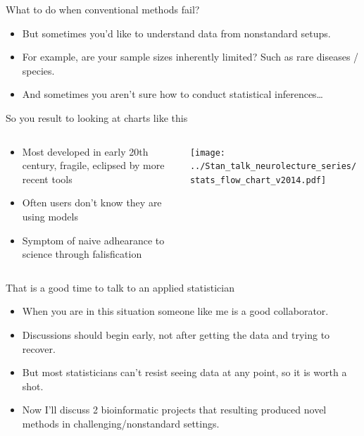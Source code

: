 \documentclass[ignorenonframetext,aspectratio=169,]{beamer}
\providecommand{\tightlist}{%
  \setlength{\itemsep}{0pt}\setlength{\parskip}{0pt}}
\begin{document}
\begin{frame}{%
\protect\hypertarget{what-to-do-when-conventional-methods-fail}{%
What to do when conventional methods fail?}}

\begin{itemize}
\tightlist
\item
  But sometimes you’d like to understand data from nonstandard setups.
\item
  For example, are your sample sizes inherently limited? Such as rare
  diseases / species.
\item
  And sometimes you aren’t sure how to conduct statistical
  inferences\ldots{}
\end{itemize}

\end{frame}

\begin{frame}{%
\protect\hypertarget{so-you-result-to-looking-at-charts-like-this}{%
So you result to looking at charts like this}}

\begin{columns}
\begin{column}{0.5\textwidth}  
    \begin{center}
    \begin{itemize}
        \item Most developed in early 20th century, fragile, eclipsed by more recent tools
        \item Often users don’t know they are using models
        \item Symptom of naive adhearance to science through falisfication
    \end{itemize}
     \end{center}
\end{column}
\begin{column}{0.5\textwidth}
    \texttt{[image: ../Stan\_talk\_neurolecture\_series/stats\_flow\_chart\_v2014.pdf]}
\end{column}
\end{columns}

\end{frame}

\begin{frame}{%
\protect\hypertarget{that-is-a-good-time-to-talk-to-an-applied-statistician}{%
That is a good time to talk to an applied statistician}}

\begin{itemize}
\tightlist
\item
  When you are in this situation someone like me is a good collaborator.
\item
  Discussions should begin early, not after getting the data and trying
  to recover.
\item
  But most statisticians can’t resist seeing data at any point, so it is
  worth a shot.
\item
  Now I’ll discuss 2 bioinformatic projects that resulting produced
  novel methods in challenging/nonstandard settings.
\end{itemize}

\end{frame}
\end{document}
